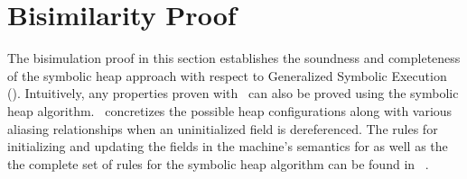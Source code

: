 \section{Bisimilarity Proof}
\label{sec:bisim}


The bisimulation proof in this section establishes the soundness and
completeness of the symbolic heap approach with respect to Generalized
Symbolic Execution (\gsetxt{}). Intuitively, any properties proven
with~\gsetxt{} can also be proved using the symbolic heap
algorithm.~\gsetxt{} concretizes the possible heap configurations
along with various aliasing relationships when an uninitialized field
is dereferenced. The rules for initializing and updating the fields in
the machine's semantics for \gsetxt{} as well as
the the complete set of rules for the symbolic heap algorithm can
be found in ~\cite{Hillery:2015}. 

